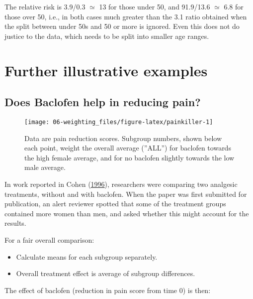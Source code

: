 \documentclass[
  10ptls,
  b5paper]{book}
\providecommand{\tightlist}{%
  \setlength{\itemsep}{0pt}\setlength{\parskip}{0pt}}
\begin{document}
The relative risk is 3.9/0.3 \(\simeq\) 13 for those under 50, and 91.9/13.6 \(\simeq\) 6.8 for those over 50, i.e., in both cases much greater than the 3.1 ratio obtained when the split between under 50s and 50 or more is ignored. Even this does not do justice to the data, which needs to be split into smaller age ranges.

\hypertarget{further-illustrative-examples}{%
\section{Further illustrative examples}\label{further-illustrative-examples}}

\hypertarget{does-baclofen-help-in-reducing-pain}{%
\subsection*{Does Baclofen help in reducing pain?}\label{does-baclofen-help-in-reducing-pain}}

\begin{figure}[H]

{\centering \texttt{[image: 06-weighting\_files/figure-latex/painkiller-1]} 

}

\caption{Data are pain reduction scores. Subgroup numbers, shown
    below each point, weight the overall average (''ALL'') for
    baclofen towards the high female average, and for no baclofen
    slightly towards the low male average.}\label{fig:painkiller}
\end{figure}

In work reported in Cohen (\protect\hyperlink{ref-cohen1996}{1996}), researchers were comparing two analgesic treatments, without and with baclofen. When the paper was first submitted for publication, an alert reviewer spotted that some of the treatment groups contained more women than men, and asked whether this might account for the results.

For a fair overall comparison:

\begin{itemize}
\tightlist
\item
  Calculate means for each subgroup separately.
\item
  Overall treatment effect is average of subgroup differences.
\end{itemize}

The effect of baclofen (reduction in pain score from time 0) is then:
\end{document}
